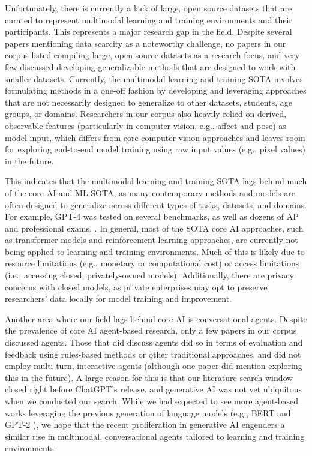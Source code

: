 \documentclass[manuscript,screen,review]{acmart}
\begin{document}
Unfortunately, there is currently a lack of large, open source datasets that are curated to represent multimodal learning and training environments and their participants. This represents a major research gap in the field. Despite several papers mentioning data scarcity as a noteworthy challenge, no papers in our corpus listed compiling large, open source datasets as a research focus, and very few discussed developing generalizable methods that are designed to work with smaller datasets. Currently, the multimodal learning and training SOTA involves formulating methods in a one-off fashion by developing and leveraging approaches that are not necessarily designed to generalize to other datasets, students, age groups, or domains. Researchers in our corpus also heavily relied on derived, observable features (particularly in computer vision, e.g., affect and pose) as model input, which differs from core computer vision approaches and leaves room for exploring end-to-end model training using raw input values (e.g., pixel values) in the future.  

This indicates that the multimodal learning and training SOTA lags behind much of the core AI and ML SOTA, as many contemporary methods and models are often designed to generalize across different types of tasks, datasets, and domains. For example, GPT-4 was tested on several benchmarks, as well as dozens of AP and professional exams. \cite{openai2023gpt4}. In general, most of the SOTA core AI approaches, such as transformer models and reinforcement learning approaches, are currently not being applied to learning and training environments. Much of this is likely due to resource limitations (e.g., monetary or computational cost) or access limitations (i.e., accessing closed, privately-owned models). Additionally, there are privacy concerns with closed models, as private enterprises may opt to preserve researchers' data locally for model training and improvement. 

Another area where our field lags behind core AI is conversational agents. Despite the prevalence of core AI agent-based research, only a few papers in our corpus discussed agents. Those that did discuss agents did so in terms of evaluation and feedback using rules-based methods or other traditional approaches, and did not employ multi-turn, interactive agents (although one paper \cite{3093310941} did mention exploring this in the future). A large reason for this is that our literature search window closed right before ChatGPT's release, and generative AI was not yet ubiquitous when we conducted our search. While we had expected to see more agent-based works leveraging the previous generation of language models (e.g., BERT \cite{devlin2018bert} and GPT-2 \cite{radford2019language}), we hope that the recent proliferation in generative AI engenders a similar rise in multimodal, conversational agents tailored to learning and training environments.
\end{document}
